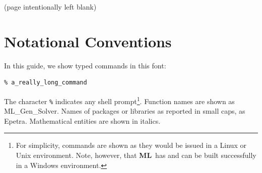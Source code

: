 \documentclass{article}[11pt]
\newcommand{\ML}     {{\bf ML}}
\begin{document}
\begin{abstract}

\ML\ is a multigrid preconditioning package intended to solve linear
systems of equations $A x = b$ where $A$ is a user supplied $n \times n$
sparse matrix, $b$ is a user supplied vector of length $n$ and $x$ is a
vector of length $n$ to be computed. \ML\ should be used on large sparse
linear systems arising from partial differential equation (PDE)
discretizations.  While technically any linear system can be considered,
\ML\ should be used on linear systems that correspond to things that work
well with multigrid methods (e.g. elliptic PDEs).  \ML\ can be used as a
stand-alone package or to generate preconditioners for a traditional
iterative solver package (e.g. Krylov methods). We have supplied support
for working with the {\sc Aztec 2.1} and {\sc AztecOO} iterative packages
\cite{Aztec}.  However, other solvers can be used by supplying a few
functions.

This document describes one specific algebraic multigrid approach:
smoothed aggregation.  This approach is used within several specialized
multigrid methods: one for the eddy current formulation for Maxwell's
equations, and a multilevel and domain decomposition method for
symmetric and non-symmetric systems of equations (like elliptic
equations, or compressible and incompressible fluid dynamics problems).
Other methods exist within \ML\ but are not described in this document.
Examples are given illustrating the problem definition and exercising
multigrid options.

\end{abstract}

%
\clearpage
\newpage

\vfill
\begin{center}
(page intentionally left blank)
\end{center}
\clearpage
\newpage


\tableofcontents
\newpage
%
%
\section{Notational Conventions}
%

In this guide, we show typed commands in this font:
\begin{verbatim}
% a_really_long_command
\end{verbatim}
The character \verb!%! indicates any shell prompt\footnote{For
  simplicity, commands are shown as they would be issued in a Linux or
  Unix environment.  Note, however, that \ML\ has and can be built
  successfully in a Windows environment.}.
Function names are shown as {\sf ML\_Gen\_Solver}.  Names of packages or
libraries as reported in small caps, as {\sc Epetra}. Mathematical
entities are shown in italics.
\end{document}
